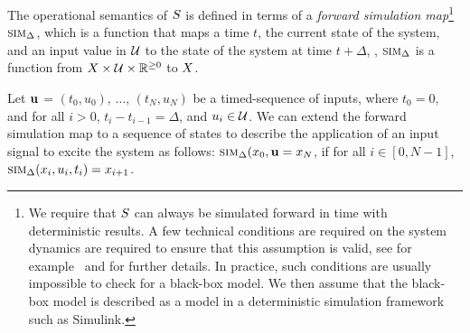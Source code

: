 The operational semantics of $S$ is defined in terms of a {\em
forward simulation map}\footnote{We require that $S$ can always
be simulated forward in time with deterministic results. A few
technical conditions are required on the system dynamics are required
to ensure that this assumption is valid, see for
example~\cite{Meiss/2007/Differential} and \cite{goebel2012hybrid} for
further details. In practice, such conditions are usually impossible
to check for a black-box model. We then assume that the black-box
model is described as a model in a deterministic simulation framework
such as Simulink\textregistered.} $\mbox{\sc sim}_\Delta$, which is a
function that maps a time $t$, the current state of the system, and an
input value in $\mathcal{U}$ to the state of the system at time
$t+\Delta$, \ie, $\mbox{\sc sim}_\Delta$ is a function from $X
\times \mathcal{U} \times \mathbb{R}^{\ge 0}$ to $X$. 

Let $\mathbf{u}$ = $(t_0, u_0)$, $\ldots$, $(t_N,u_N)$ be a
timed-sequence of inputs, where $t_0 = 0$, and for all $i > 0$, $t_i -
t_{i-1} = \Delta$, and $u_i \in \mathcal{U}$.  We can extend the forward
simulation map to a sequence of states to describe the application of
an input signal to excite the system as follows:
$\mbox{\sc sim}_\Delta(x_0, \mathbf{u} = x_N$, if for all $i  \in
[0,N-1]$, $\mbox{\sc sim}_\Delta(x_i, u_i,t_i) = x_{i+1}$.


% 



